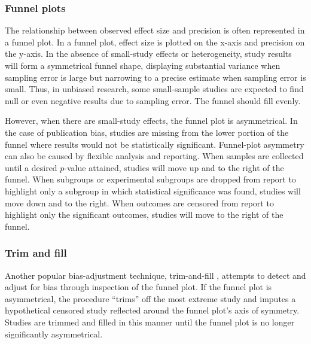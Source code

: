 \documentclass[man]{apa6}
\begin{document}
\subsubsection{Funnel plots}
The relationship between observed effect size and precision is often represented in a funnel plot. In a funnel plot, effect size is plotted on the x-axis and precision on the y-axis. In the absence of small-study effects or heterogeneity, study results will form a symmetrical funnel shape, displaying substantial variance when sampling error is large but narrowing to a precise estimate when sampling error is small. Thus, in unbiased research, some small-sample studies are expected to find null or even negative results due to sampling error. The funnel should fill evenly.

However, when there are small-study effects, the funnel plot is asymmetrical. In the case of publication bias, studies are missing from the lower portion of the funnel where results would not be statistically significant. Funnel-plot asymmetry can also be caused by flexible analysis and reporting. When samples are collected until a desired $p$-value attained, studies will move up and to the right of the funnel. When subgroups or experimental subgroups are dropped from report to highlight only a subgroup in which statistical significance was found, studies will move down and to the right. When outcomes are censored from report to highlight only the significant outcomes, studies will move to the right of the funnel.

\subsubsection{Trim and fill}
Another popular bias-adjustment technique, trim-and-fill \citep{Duval:Tweedie:2000}, attempts to detect and adjust for bias through inspection of the funnel plot. If the funnel plot is asymmetrical, the procedure ``trims'' off the most extreme study and imputes a hypothetical censored study reflected around the funnel plot's axis of symmetry. Studies are trimmed and filled in this manner until the funnel plot is no longer significantly asymmetrical. 
\end{document}
